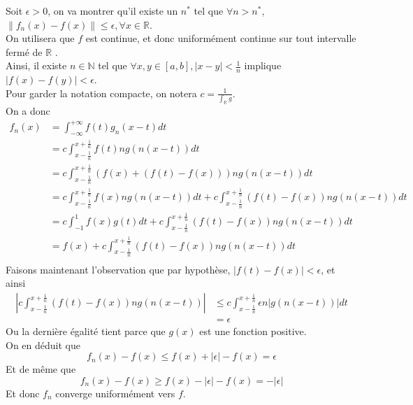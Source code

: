 \documentclass[11pt, a4paper]{article}
\newcommand\N[1]{\left\lVert#1\right\rVert}
\begin{document}
Soit $\epsilon >0$, on va montrer qu'il existe un $n^{*}$ tel que $\forall n> n^{*}$, $\N { f_n( x) - f( x) } \leq \epsilon, \forall x \in \mathbb{R}$.\\
On utilisera que $f$ est continue, et donc uniformément continue sur tout intervalle fermé de  $\mathbb{R}$ .\\
Ainsi, il existe $n \in \mathbb{N}$ tel que $\forall x,y \in [ a,b] , |x-y| < \frac{1}{n}  $ implique $ | f( x) - f( y) | < \epsilon$.\\
Pour garder la notation compacte, on notera $ c = \frac{1}{ \int_{ \mathbb{R}} g}$.\\
On a donc
\begin{align*}
	f_n ( x)  &= \int_{-\infty}^{+\infty} f( t) g_n ( x-t) dt\\
			      &= c \int_{x- \frac{1}{n}}^{x+ \frac{1}{n}} f( t) n g( n( x-t) ) dt\\
			      &= c \int_{x-\frac{1}{n}}^{x+ \frac{1}{n}}(  f( x) + ( f( t) -f( x) )  )n g( n( x-t) ) dt\\
			      &= c \int_{ x- \frac{1}{n} }^{ x+ \frac{1}{n} } f( x) n g( n( x-t) ) dt + c \int_{ x-\frac{1}{n} }^{ x+ \frac{1}{n}	 }	( f( t) -f( x) ) n g( n( x-t) ) dt\\
			      &= c \int_{ -1 }^{ 1 } f( x)  g( t ) dt + c \int_{ x-\frac{1}{n} }^{ x+ \frac{1}{n}	 }	( f( t) -f( x) ) n g( n( x-t) ) dt\\
			      &=  f( x) + c \int_{ x-\frac{1}{n} }^{ x+ \frac{1}{n}	 }	( f( t) -f( x) ) n g( n( x-t) ) dt\\
\end{align*}
Faisons maintenant l'observation que par hypothèse, $ |f( t) - f( x) | < \epsilon$, et ainsi 
\begin{align*}
	\left|c \int_{ x-\frac{1}{n} }^{ x+ \frac{1}{n} } ( f( t) - f( x) ) n g( n( x-t) )  \right| & \leq  c \int_{ x- \frac{1}{n} }^{ x+ \frac{1}{n} } \epsilon n \left|g( n( x-t) ) \right| dt\\
										       &= \epsilon
\end{align*}
Ou la dernière égalité tient parce que $g( x) $ est une fonction positive.\\
On en déduit que 
\[ 
	f_n( x) - f( x)  \leq  f( x)  + | \epsilon| - f( x)  = \epsilon
\]
Et de même que
\[ 
	f_n ( x)  - f( x)  \geq f( x)  -  | \epsilon| -f ( x)  = - | \epsilon|
\]
Et donc $f_n$ converge uniformément vers $f$.
\end{document}
